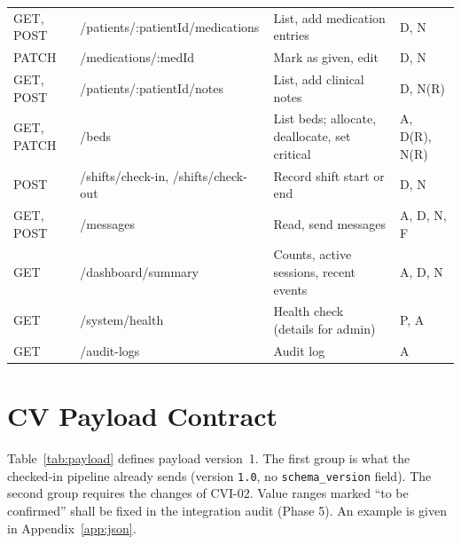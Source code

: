 \documentclass[a4paper,11pt]{scrreprt}
\newcommand{\code}[1]{\texttt{#1}}
\begin{document}
\begin{longtable}{@{}>{\ttfamily\footnotesize}p{1.7cm}>{\ttfamily\footnotesize}p{5.4cm}>{\raggedright\arraybackslash}p{4.9cm}>{\raggedright\arraybackslash}p{2.2cm}@{}}
GET, POST & /patients/:patientId/medications & List, add medication entries & D, N\\
PATCH & /medications/:medId & Mark as given, edit & D, N\\
GET, POST & /patients/:patientId/notes & List, add clinical notes & D, N(R)\\
GET, PATCH & /beds & List beds; allocate, deallocate, set critical & A, D(R), N(R)\\
POST & /shifts/check-in, /shifts/check-out & Record shift start or end & D, N\\
GET, POST & /messages & Read, send messages & A, D, N, F\\
GET & /dashboard/summary & Counts, active sessions, recent events & A, D, N\\
GET & /system/health & Health check (details for admin) & P, A\\
GET & /audit-logs & Audit log & A\\
\end{longtable}

\section{CV Payload Contract}\label{sec:payload}
Table~\ref{tab:payload} defines payload version~1. The first group is what the checked-in pipeline already sends (version \code{1.0}, no \code{schema_version} field). The second group requires the changes of CVI-02. Value ranges marked ``to be confirmed'' shall be fixed in the integration audit (Phase 5). An example is given in Appendix~\ref{app:json}.
\end{document}
